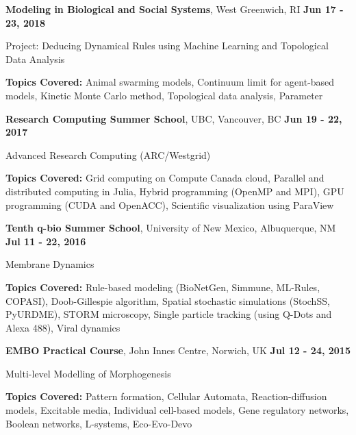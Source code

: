 \documentclass[margin,line]{res}
\newenvironment{list1}{
  \begin{list}{\ding{113}}{
      \setlength{\itemsep}{0in}
      \setlength{\parsep}{0in} \setlength{\parskip}{0in}
      \setlength{\topsep}{0in} \setlength{\partopsep}{0in}
      \setlength{\leftmargin}{0.17in}}}{\end{list}}
\begin{document}
\begin{resume}
{\bf Modeling in Biological and Social Systems}, West Greenwich, RI \hfill {\bf Jun 17 - 23, 2018}\\
\vspace*{-.2cm}
\begin{list1}
\item[] Project: Deducing Dynamical Rules using Machine Learning and Topological Data Analysis
\vspace*{0.2cm}
\item[] {\bf Topics Covered:} Animal swarming models, Continuum limit for agent-based models, Kinetic Monte Carlo method, Topological data analysis, Parameter %
\end{list1}

{\bf Research Computing Summer School}, UBC, Vancouver, BC \hfill {\bf Jun 19 - 22, 2017}\\
\vspace*{-.2cm}
\begin{list1}
\item[] Advanced Research Computing (ARC/Westgrid)
\vspace*{0.2cm}
\item[] {\bf Topics Covered:} Grid computing on Compute Canada cloud, Parallel and distributed computing in Julia, Hybrid programming (OpenMP and MPI), GPU programming (CUDA and OpenACC), Scientific visualization using ParaView
\end{list1}


{\bf Tenth q-bio Summer School}, University of New Mexico, Albuquerque, NM  \hfill {\bf Jul 11 - 22, 2016}\\
\vspace*{-.2cm}
\begin{list1}
\item[] Membrane Dynamics
\vspace*{0.2cm}
\item[] {\bf Topics Covered:} Rule-based modeling (BioNetGen, Simmune, ML-Rules, COPASI), Doob-Gillespie algorithm, Spatial stochastic simulations (StochSS, PyURDME), STORM microscopy, Single particle tracking (using Q-Dots and Alexa 488), Viral dynamics
\end{list1}

{\bf EMBO Practical Course}, John Innes Centre, Norwich, UK  \hfill {\bf Jul 12 - 24, 2015}\\
\vspace*{-.2cm}
\begin{list1}
\item[] Multi-level Modelling of Morphogenesis
\vspace*{0.2cm}
\item[] {\bf Topics Covered:} Pattern formation, Cellular Automata, Reaction-diffusion models, Excitable media, Individual cell-based models, Gene regulatory networks, Boolean networks, L-systems, Eco-Evo-Devo
\end{list1}


\end{resume}
\end{document}
